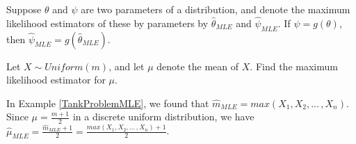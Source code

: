 \begin{prop}\label{MLETransferability} Suppose $\theta$ and $\psi$ are two parameters of a distribution, and denote the maximum likelihood estimators of these by parameters by $\widehat{\theta}_{MLE}$ and $\widehat{\psi}_{MLE}$. If $\psi = g (\theta)$, then $\widehat{\psi}_{MLE} = g(\widehat{\theta}_{MLE})$.
\end{prop}

\begin{examp}Let $X \sim Uniform(m)$, and let $\mu$ denote the mean of $X$. Find the maximum likelihood estimator for $\mu$.
\par
\noindent In Example \ref{TankProblemMLE}, we found that $\widehat{m}_{MLE} = max(X_1,X_2, ... \,,X_n)$. Since $\mu = \frac{m+1}{2}$ in a discrete uniform distribution, we have $\widehat{\mu}_{MLE} = \frac{\widehat{m}_{MLE}+1}{2} = \frac{max(X_1,X_2, ... \,,X_n)+1}{2}$.
\end{examp}

